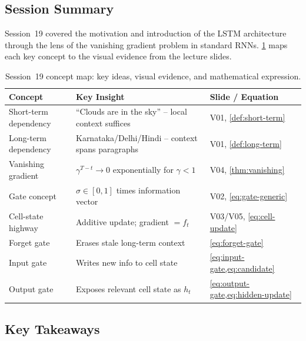 \documentclass[12pt,a4paper]{article}
\begin{document}
\subsection{Session Summary}
\label{subsec:session-summary}

Session~19 covered the motivation and introduction of the LSTM architecture
through the lens of the vanishing gradient problem in standard RNNs.
\cref{tab:session-summary} maps each key concept to the visual evidence
from the lecture slides.

\begin{table}[ht]
  \centering
  \caption{Session~19 concept map: key ideas, visual evidence, and
           mathematical expression.}
  \label{tab:session-summary}
  \begin{tabularx}{\linewidth}{@{}lXl@{}}
    \toprule
    \textbf{Concept}
      & \textbf{Key Insight}
      & \textbf{Slide / Equation} \\
    \midrule
    Short-term dependency
      & ``Clouds are in the sky'' -- local context suffices
      & V01, \cref{def:short-term} \\
    Long-term dependency
      & Karnataka/Delhi/Hindi -- context spans paragraphs
      & V01, \cref{def:long-term} \\
    Vanishing gradient
      & $\gamma^{T-t} \to 0$ exponentially for $\gamma < 1$
      & V04, \cref{thm:vanishing} \\
    Gate concept
      & $\sigma \in [0,1]$ times information vector
      & V02, \cref{eq:gate-generic} \\
    Cell-state highway
      & Additive update; gradient $= f_t$
      & V03/V05, \cref{eq:cell-update} \\
    Forget gate
      & Erases stale long-term context
      & \cref{eq:forget-gate} \\
    Input gate
      & Writes new info to cell state
      & \cref{eq:input-gate,eq:candidate} \\
    Output gate
      & Exposes relevant cell state as $h_t$
      & \cref{eq:output-gate,eq:hidden-update} \\
    \bottomrule
  \end{tabularx}
\end{table}

\subsection{Key Takeaways}
\label{subsec:takeaways}
\end{document}
